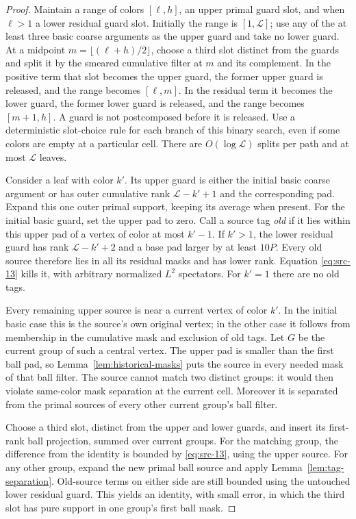 \begin{proof}
Maintain a range of colors $[\ell,h]$, an upper primal guard slot, and
when $\ell>1$ a lower residual guard slot.  Initially the range is
$[1,\mathcal L]$; use any of the at least three basic coarse arguments
as the upper guard and take no lower guard.  At a midpoint
$m=\lfloor(\ell+h)/2\rfloor$, choose a third slot distinct from the
guards and split it by the smeared cumulative filter at $m$ and its
complement.  In the positive term that slot becomes the upper guard,
the former upper guard is released, and the range becomes $[\ell,m]$.
In the residual term it becomes the lower guard, the former lower
guard is released, and the range becomes $[m+1,h]$.  A guard is not
postcomposed before it is released.  Use a deterministic slot-choice
rule for each branch of this binary search, even if some colors are
empty at a particular cell.  There are $O(\log\mathcal L)$ splits per
path and at most $\mathcal L$ leaves.

Consider a leaf with color $k'$.  Its upper guard is either the initial
basic coarse argument or has outer cumulative rank
$\mathcal L-k'+1$ and the corresponding pad.  Expand this one outer
primal support, keeping its average when present.  For the initial basic
guard, set the upper pad to zero.  Call a source tag
\emph{old} if it lies within this upper pad of a vertex of color at
most $k'-1$.  If $k'>1$, the lower residual guard has rank
$\mathcal L-k'+2$ and a base pad larger by at least $10P$.  Every old source
therefore lies in all its residual masks and has lower rank.  Equation
\eqref{eq:src-13} kills it, with arbitrary normalized $L^2$ spectators.
For $k'=1$ there are no old tags.

Every remaining upper source is near a current vertex of color $k'$.
In the initial basic case this is the source's own original vertex;
in the other case it follows from membership in the cumulative mask
and exclusion of old tags.  Let $G$ be the current group of such a
central vertex.  The upper pad is smaller than the first ball pad, so
Lemma~\ref{lem:historical-masks} puts the source in every needed mask
of that ball filter.  The source cannot match two distinct groups:
it would then violate same-color mask separation at the current cell.
Moreover it is separated from the primal sources of every other
current group's ball filter.

Choose a third slot, distinct from the upper and lower guards, and
insert its first-rank ball projection, summed over current groups.
For the matching group, the difference from the identity is bounded
by \eqref{eq:src-13}, using the upper source.  For any other group,
expand the new primal ball source and apply
Lemma~\ref{lem:tag-separation}.  Old-source terms on either side are
still bounded using the untouched lower residual guard.  This yields
an identity, with small error, in which the third slot has pure support
in one group's first ball mask.


\end{proof}
